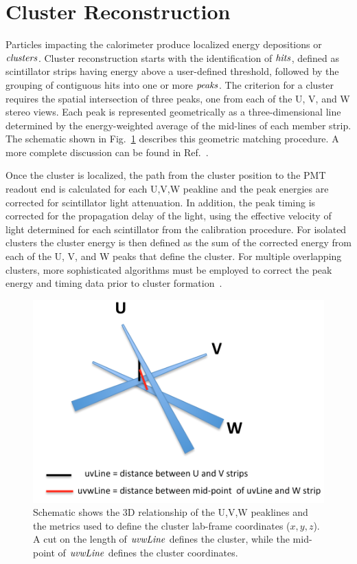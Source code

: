 \section{Cluster Reconstruction}

Particles impacting the calorimeter produce localized energy depositions or ${\it clusters}$. Cluster reconstruction
starts with the identification of ${\it hits}$, defined as scintillator strips having energy above a user-defined
threshold, followed by the grouping of contiguous hits into one or more ${\it peaks}$. The criterion for a cluster
requires the spatial intersection of three peaks, one from each of the U, V, and W stereo views. Each peak is
represented geometrically as a three-dimensional line determined by the energy-weighted average of the mid-lines
of each member strip. The schematic shown in Fig.~\ref{fig:S6_0} describes this geometric matching procedure.
A more complete discussion can be found in Ref.~\cite{nim:recon}.

Once the cluster is localized, the path from the cluster position to the PMT readout end is calculated for each
U,V,W peakline and the peak energies are corrected for scintillator light attenuation. In addition, the peak timing
is corrected for the propagation delay of the light, using the effective velocity of light determined for each
scintillator from the calibration procedure. For isolated clusters the cluster energy is then defined as the sum of
the corrected energy from each of the U, V, and W peaks that define the cluster. For multiple overlapping clusters,
more sophisticated algorithms must be employed to correct the peak energy and timing data prior to cluster
formation~\cite{nim:recon}.

\begin{figure}[hbt]
\centering
\includegraphics[width=0.95\columnwidth,keepaspectratio]{img/S6_0.png}
\caption{Schematic shows the 3D relationship of the U,V,W peaklines and the metrics used to define the cluster
  lab-frame coordinates ($x,y,z$). A cut on the length of ${\it uvwLine}$ defines the cluster, while the mid-point
  of ${\it uvwLine}$ defines the cluster coordinates.}
\label{fig:S6_0}
\end{figure}

